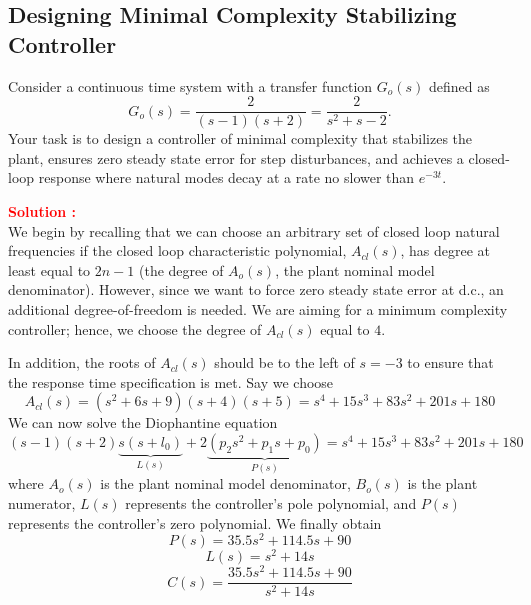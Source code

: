 \documentclass[12pt]{article}
\begin{document}
\clearpage
\subsection{Designing Minimal Complexity Stabilizing Controller}
Consider a continuous time system with a transfer function \(G_o(s)\) defined as
\begin{equation}
G_o(s) = \frac{2}{(s - 1)(s + 2)} = \frac{2}{s^2 + s - 2}.
\end{equation}
Your task is to design a controller of minimal complexity that stabilizes the plant, ensures zero steady state error for step disturbances, and achieves a closed-loop response where natural modes decay at a rate no slower than \(e^{-3t}\).

\textbf{\textcolor{red}{Solution :}} \\ 
We begin by recalling that we can choose an arbitrary set of closed loop natural frequencies if the closed loop characteristic polynomial, $A_{cl}(s)$, has degree at least equal to $2n-1$ (the degree of $A_o(s)$, the plant nominal model denominator). However, since we want to force zero steady state error at d.c., an additional degree-of-freedom is needed. We are aiming for a minimum complexity controller; hence, we choose the degree of $A_{cl}(s)$ equal to $4$.

In addition, the roots of $A_{cl}(s)$ should be to the left of $s = -3$ to ensure that the response time specification is met. Say we choose
\begin{equation}
A_{cl}(s) = (s^2 + 6s + 9)(s + 4)(s + 5) = s^4 + 15s^3 + 83s^2 + 201s + 180
\end{equation}
We can now solve the Diophantine equation
\begin{equation}
(s - 1)(s + 2) \underbrace{s(s + l_0)}_{L(s)} + 2 \underbrace{(p_2s^2 + p_1s + p_0)}_{P(s)} = s^4 + 15s^3 + 83s^2 + 201s + 180
\end{equation}
where $A_o(s)$ is the plant nominal model denominator, $B_o(s)$ is the plant numerator, $L(s)$ represents the controller's pole polynomial, and $P(s)$ represents the controller's zero polynomial.
We finally obtain
\begin{equation}
P(s) = 35.5s^2 + 114.5s + 90
\end{equation}
\begin{equation}
L(s) = s^2 + 14s
\end{equation}
\begin{equation}
C(s) = \frac{35.5s^2 + 114.5s + 90}{s^2 + 14s}
\end{equation}
\end{document}
